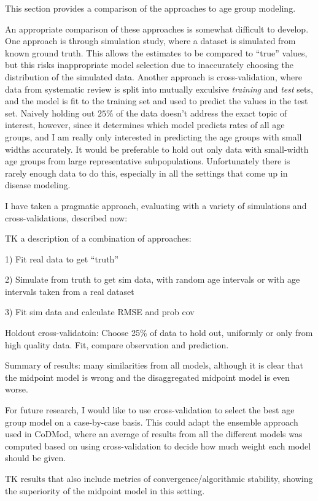 This section provides a comparison of the approaches to age group
modeling.

An appropriate comparison of these approaches is somewhat difficult to
develop.  One approach is through simulation study, where a dataset is
simulated from known ground truth.  This allows the estimates to be
compared to ``true'' values, but this risks
inappropriate model selection due to inaccurately choosing the
distribution of the simulated data.  Another approach is
cross-validation, where data from systematic review is split into
mutually exculsive
\emph{training} and \emph{test} sets, and the model is fit to the
training set and used to predict the values in the test set.  Naively
holding out $25\%$ of the data doesn't address the exact topic of
interest, however, since it determines which model predicts rates of
all age groups, and I am really only interested in predicting the age
groups with small widths accurately.  It would be preferable to hold
out only data with small-width age groups from large representative
subpopulations.  Unfortunately there is rarely enough data to do this,
especially in all the settings that come up in disease modeling.

I have taken a pragmatic approach, evaluating with a variety of
simulations and cross-validations, described now:

TK a description of a combination of approaches:

1) Fit real data to get ``truth''

2) Simulate from truth to get sim data, with random age intervals or with age intervals taken from a real dataset

3) Fit sim data and calculate RMSE and prob cov

Holdout cross-validatoin: Choose 25\% of data to hold out, uniformly
or only from high quality data.  Fit, compare observation and
prediction.

Summary of results: many similarities from all models, although it is
clear that the midpoint model is wrong and the disaggregated midpoint
model is even worse.

For future research, I would like to use cross-validation to select
the best age group model on a case-by-case basis.  This could adapt
the ensemble approach used in CoDMod, where an average of results from
all the different models was computed based on using cross-validation
to decide how much weight each model should be given.

TK results that also include metrics of convergence/algorithmic
stability, showing the superiority of the midpoint model in this
setting.

